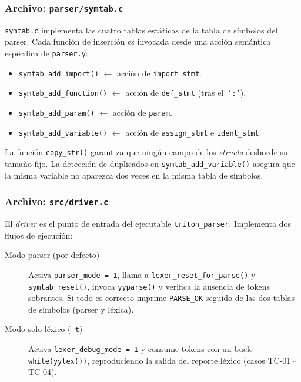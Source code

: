 

\subsubsection{Archivo: \texttt{parser/symtab.c}}

\texttt{symtab.c} implementa las cuatro tablas estáticas de la tabla de símbolos
del parser. Cada función de inserción es invocada desde una acción semántica
específica de \texttt{parser.y}:

\begin{itemize}
  \item \texttt{symtab\_add\_import()} $\leftarrow$ acción de \texttt{import\_stmt}.
  \item \texttt{symtab\_add\_function()} $\leftarrow$ acción de \texttt{def\_stmt} (tras el~\texttt{':'}).
  \item \texttt{symtab\_add\_param()} $\leftarrow$ acción de \texttt{param}.
  \item \texttt{symtab\_add\_variable()} $\leftarrow$ acción de \texttt{assign\_stmt} e \texttt{ident\_stmt}.
\end{itemize}

La función \texttt{copy\_str()} garantiza que ningún campo de los \textit{structs}
desborde su tamaño fijo. La detección de duplicados en \texttt{symtab\_add\_variable()}
asegura que la misma variable no aparezca dos veces en la misma tabla de símbolos.



\subsubsection{Archivo: \texttt{src/driver.c}}

El \textit{driver} es el punto de entrada del ejecutable \texttt{triton\_parser}.
Implementa dos flujos de ejecución:

\begin{description}
  \item[Modo parser (por defecto)] Activa \texttt{parser\_mode = 1}, llama a
    \texttt{lexer\_reset\_for\_parse()} y \texttt{symtab\_reset()}, invoca
    \texttt{yyparse()} y verifica la ausencia de tokens sobrantes.
    Si todo es correcto imprime \texttt{PARSE\_OK} seguido de las dos tablas
    de símbolos (parser y léxica).
  \item[Modo solo-léxico (\texttt{-t})] Activa \texttt{lexer\_debug\_mode = 1}
    y consume tokens con un bucle \texttt{while(yylex())}, reproduciendo la
    salida del reporte léxico (casos TC-01\,--\,TC-04).
\end{description}

